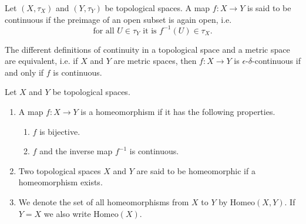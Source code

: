 \begin{defbox}
    \begin{definition}
        Let \((X, \tau_X)\) and \((Y, \tau_Y)\) be {\color{mathif}topological spaces}. A {\color{mathif}map} \(f: X \longrightarrow Y\) is said to be {\color{maththen}continuous} if the preimage of an open subset is again open, i.e.
        \begin{equation}
            \text{for all } U \in \tau_Y \text{ it is } f^{-1}(U) \in \tau_X \text{.}
        \end{equation}
    \end{definition}
\end{defbox}
\begin{thmbox}
    \begin{lemma}
        The different definitions of continuity in a topological space and a metric space are equivalent, i.e. if \(X\) and \(Y\) are metric spaces, then \(f: X \longrightarrow Y\) is \(\epsilon\)-\(\delta\)-continuous if and only if \(f\) is continuous.
    \end{lemma}
\end{thmbox}

\begin{defbox}
    \begin{definition}[Homeomorphism]
        Let \(X\) and \(Y\) be {\color{mathif}topological spaces}.
        \begin{enumerate}
            \item A {\color{mathobj}map} \(f: X \longrightarrow Y\) is a {\color{maththen}homeomorphism} if it has the following properties.

            \begin{enumerate}
                \item \(f\) is {\color{mathif}bijective}.
                \item \(f\) and the {\color{mathif}inverse map} \(f^{-1}\) is {\color{mathif}continuous}.
            \end{enumerate}

            \item Two topological spaces \(X\) and \(Y\) are said to be {\color{maththen}homeomorphic} if a homeomorphism exists.

            \item We denote the set of all homeomorphisms from \(X\) to \(Y\) by \(\mathrm{Homeo}(X, Y)\). If \(Y = X\) we also write \(\mathrm{Homeo}(X)\).
        \end{enumerate}
    \end{definition}
\end{defbox}

